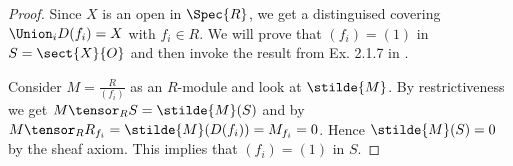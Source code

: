\begin{proof}
Since $X$ is an open in $\Spec{R}$, we get a distinguised covering $\Union_i D(f_i) = X$ with $f_i\in R$.
We will prove that $(f_i) = (1)$ in $S = \sect{X}{O}$ and 
then invoke the result from Ex. 2.1.7 in \cite{harts}.

Consider $M = \frac{R}{(f_i)}$ as an $R$-module and look at $\stilde{M}$.
By restrictiveness we get $M \tensor_R S = \stilde{M}(S)$ and  
by $M \tensor_R R_{f_i} = \stilde{M}(D(f_i)) = M_{f_i} = 0$. 
Hence $\stilde{M}(S) = 0$ by the sheaf axiom.
This implies that $(f_i) = (1)$ in $S$.
\end{proof}
